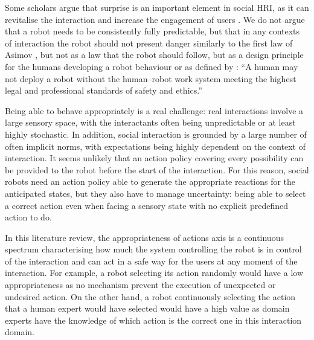     Some scholars argue that surprise is an important element in social HRI, as it can revitalise the interaction and increase the engagement of users \citep{lemaignan2014dynamics}. We do not argue that a robot needs to be consistently fully predictable, but that in any contexts of interaction the robot should not present danger similarly to the first law of Asimov \citep{asimov1942runaround}, but not as a law that the robot should follow, but as a design principle for the humans developing a robot behaviour or as defined by \cite{murphy2009beyond}: “A human may not deploy a robot without the human–robot work system meeting the highest legal and professional standards of safety and ethics.”
    
    Being able to behave appropriately is a real challenge: real interactions involve a large sensory space, with the interactants often being unpredictable or at least highly stochastic. In addition, social interaction is grounded by a large number of often implicit norms, with expectations being highly dependent on the context of interaction.  It seems unlikely that an action policy covering every possibility can be provided to the robot before the start of the interaction. For this reason, social robots need an action policy able to generate the appropriate reactions for the anticipated states, but they also have to manage uncertainty: being able to select a correct action even when facing a sensory state with no explicit predefined action to do. 

    In this literature review, the appropriateness of actions axis is a continuous spectrum characterising how much the system controlling the robot is in control of the interaction and can act in a safe way for the users at any moment of the interaction. For example, a robot selecting its action randomly would have a low appropriateness as no mechanism prevent the execution of unexpected or undesired action. On the other hand, a robot continuously selecting the action that a human expert would have selected would have a high value as domain experts have the knowledge of which action is the correct one in this interaction domain.


